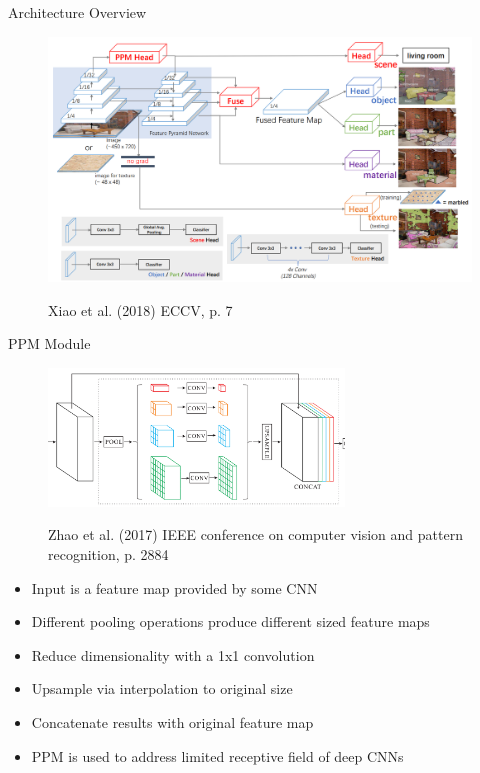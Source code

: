 \documentclass{beamer}
\begin{document}

\begin{frame}{Architecture Overview}
    \begin{figure}
        \centering
        \includegraphics[width=\textwidth]{Images/UPerNetArchitectureOverview.png}

        \vspace{0.5em}
        {\tiny Xiao et al. (2018) ECCV, p. 7}
    \end{figure}
\end{frame}


\begin{frame}{PPM Module}
    \begin{figure}
        \centering
        \includegraphics[width=0.7\textwidth]{Images/PPMModuleOverview.png}

        {\tiny Zhao et al. (2017) IEEE conference on computer vision and pattern recognition, p. 2884}
    \end{figure}
    \begin{itemize}
        \item Input is a feature map provided by some CNN
        \item Different pooling operations produce different sized feature maps
        \item Reduce dimensionality with a 1x1 convolution
        \item Upsample via interpolation to original size
        \item Concatenate results with original feature map
        \item PPM is used to address limited receptive field of deep CNNs
    \end{itemize}
\end{frame}
\end{document}
